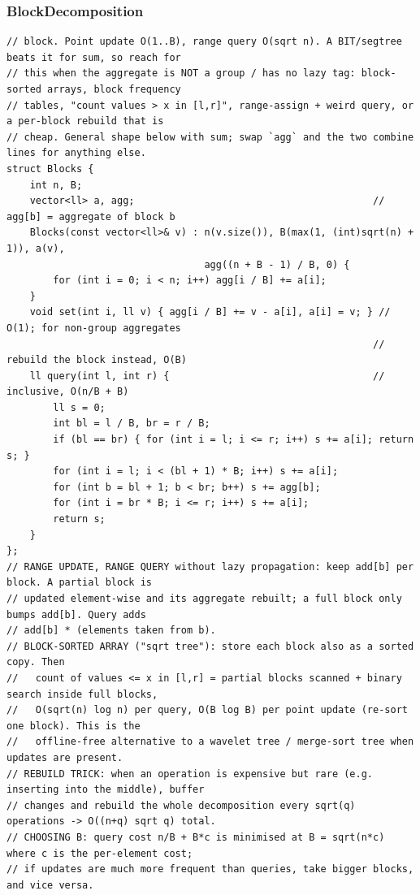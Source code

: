 \documentclass[9pt,a4paper,twocolumn]{extarticle}
\begin{document}
\subsubsection{BlockDecomposition}
\nopagebreak{\footnotesize\sffamily\color{blurb} SQRT / BLOCK DECOMPOSITION. Split [0,n) into blocks of B \textasciitilde{} sqrt(n) and keep one aggregate per\par}\nopagebreak
\begin{lstlisting}
// block. Point update O(1..B), range query O(sqrt n). A BIT/segtree beats it for sum, so reach for
// this when the aggregate is NOT a group / has no lazy tag: block-sorted arrays, block frequency
// tables, "count values > x in [l,r]", range-assign + weird query, or a per-block rebuild that is
// cheap. General shape below with sum; swap `agg` and the two combine lines for anything else.
struct Blocks {
    int n, B;
    vector<ll> a, agg;                                         // agg[b] = aggregate of block b
    Blocks(const vector<ll>& v) : n(v.size()), B(max(1, (int)sqrt(n) + 1)), a(v),
                                  agg((n + B - 1) / B, 0) {
        for (int i = 0; i < n; i++) agg[i / B] += a[i];
    }
    void set(int i, ll v) { agg[i / B] += v - a[i], a[i] = v; } // O(1); for non-group aggregates
                                                               // rebuild the block instead, O(B)
    ll query(int l, int r) {                                   // inclusive, O(n/B + B)
        ll s = 0;
        int bl = l / B, br = r / B;
        if (bl == br) { for (int i = l; i <= r; i++) s += a[i]; return s; }
        for (int i = l; i < (bl + 1) * B; i++) s += a[i];
        for (int b = bl + 1; b < br; b++) s += agg[b];
        for (int i = br * B; i <= r; i++) s += a[i];
        return s;
    }
};
// RANGE UPDATE, RANGE QUERY without lazy propagation: keep add[b] per block. A partial block is
// updated element-wise and its aggregate rebuilt; a full block only bumps add[b]. Query adds
// add[b] * (elements taken from b).
// BLOCK-SORTED ARRAY ("sqrt tree"): store each block also as a sorted copy. Then
//   count of values <= x in [l,r] = partial blocks scanned + binary search inside full blocks,
//   O(sqrt(n) log n) per query, O(B log B) per point update (re-sort one block). This is the
//   offline-free alternative to a wavelet tree / merge-sort tree when updates are present.
// REBUILD TRICK: when an operation is expensive but rare (e.g. inserting into the middle), buffer
// changes and rebuild the whole decomposition every sqrt(q) operations -> O((n+q) sqrt q) total.
// CHOOSING B: query cost n/B + B*c is minimised at B = sqrt(n*c) where c is the per-element cost;
// if updates are much more frequent than queries, take bigger blocks, and vice versa.
\end{lstlisting}
\end{document}
